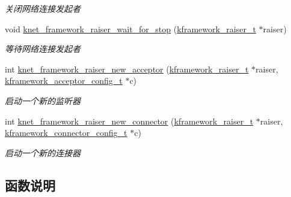 \begin{DoxyCompactItemize}
\begin{DoxyCompactList}\small\item\em 关闭网络连接发起者 \end{DoxyCompactList}\item 
void \hyperlink{a00074_afcada6a8c7bb6d0d91c55df37352f5fb_afcada6a8c7bb6d0d91c55df37352f5fb}{knet\+\_\+framework\+\_\+raiser\+\_\+wait\+\_\+for\+\_\+stop} (\hyperlink{a00066_af10637001508cbbf3a84f95c71318532_af10637001508cbbf3a84f95c71318532}{kframework\+\_\+raiser\+\_\+t} $\ast$raiser)
\begin{DoxyCompactList}\small\item\em 等待网络连接发起者 \end{DoxyCompactList}\item 
int \hyperlink{a00074_a1fa517b4b3e577a30f12f5b77dfaa9a3_a1fa517b4b3e577a30f12f5b77dfaa9a3}{knet\+\_\+framework\+\_\+raiser\+\_\+new\+\_\+acceptor} (\hyperlink{a00066_af10637001508cbbf3a84f95c71318532_af10637001508cbbf3a84f95c71318532}{kframework\+\_\+raiser\+\_\+t} $\ast$raiser, \hyperlink{a00066_a39c993eb450173e4fde04498d757f9b6_a39c993eb450173e4fde04498d757f9b6}{kframework\+\_\+acceptor\+\_\+config\+\_\+t} $\ast$c)
\begin{DoxyCompactList}\small\item\em 启动一个新的监听器 \end{DoxyCompactList}\item 
int \hyperlink{a00074_af58dbe8c5764d42ecb712d4a93391d11_af58dbe8c5764d42ecb712d4a93391d11}{knet\+\_\+framework\+\_\+raiser\+\_\+new\+\_\+connector} (\hyperlink{a00066_af10637001508cbbf3a84f95c71318532_af10637001508cbbf3a84f95c71318532}{kframework\+\_\+raiser\+\_\+t} $\ast$raiser, \hyperlink{a00066_a44d3033eba5a4fd784a741700a7a2521_a44d3033eba5a4fd784a741700a7a2521}{kframework\+\_\+connector\+\_\+config\+\_\+t} $\ast$c)
\begin{DoxyCompactList}\small\item\em 启动一个新的连接器 \end{DoxyCompactList}\end{DoxyCompactItemize}


\subsection{函数说明}
\hypertarget{a00074_a2b6bd6bd9b9c60ab24eab0c0700bc855_a2b6bd6bd9b9c60ab24eab0c0700bc855}{}

